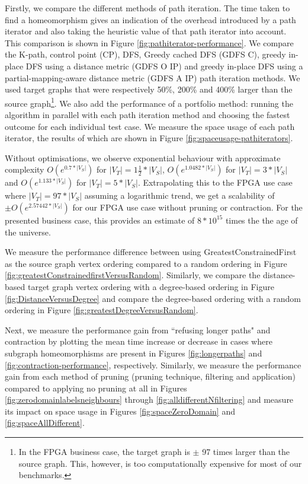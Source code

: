 Firstly, we compare the different methods of path iteration. The time taken to find a homeomorphism gives an indication of the overhead introduced by a path iterator and also taking the heuristic value of that path iterator into account. This comparison is shown in Figure \ref{fig:pathiterator-performance}. We compare the K-path, control point (CP), DFS, Greedy cached DFS (GDFS C), greedy in-place DFS using a distance metric (GDFS O IP) and greedy in-place DFS using a partial-mapping-aware distance metric (GDFS A IP) path iteration methods. We used target graphs that were respectively 50\%, 200\% and 400\% larger than the source graph\footnote{In the FPGA business case, the target graph is $\pm$ 97 times larger than the source graph. This, however, is too computationally expensive for most of our benchmarks.}. We also add the performance of a portfolio method: running the algorithm in parallel with each path iteration method and choosing the fastest outcome for each individual test case. We measure the space usage of each path iterator, the results of which are shown in Figure \ref{fig:spaceusage-pathiterators}.

Without optimisations, we observe exponential behaviour with approximate complexity $O(e^{0.7*|V_S|})$ for $|V_T|=1\frac{1}{2}*|V_S|$, $O(e^{1.0482*|V_S|})$ for $|V_T|=3*|V_S|$ and $O(e^{1.133*|V_S|})$ for $|V_T|=5*|V_S|$. Extrapolating this to the FPGA use case where $|V_T|=97*|V_S|$ assuming a logarithmic trend, we get a scalability of $\pm O(e^{2.57442*|V_S|})$ for our FPGA use case without pruning or contraction. For the presented business case, this provides an estimate of $8 * 10^{15}$ times the the age of the universe.

We measure the performance difference between using GreatestConstrainedFirst as the source graph vertex ordering compared to a random ordering in Figure \ref{fig:greatestConstrainedfirstVersusRandom}. Similarly, we compare the distance-based target graph vertex ordering with a degree-based ordering in Figure \ref{fig:DistanceVersusDegree} and compare the degree-based ordering with a random ordering in Figure \ref{fig:greatestDegreeVersusRandom}.

Next, we measure the performance gain from ``refusing longer paths" and contraction by plotting the mean time increase or decrease in cases where subgraph homeomorphisms are present in Figures \ref{fig:longerpaths} and \ref{fig:contraction-performance}, respectively. Similarly, we measure the performance gain from each method of pruning (pruning technique, filtering and application) compared to applying no pruning at all in Figures \ref{fig:zerodomainlabelsneighbours} through \ref{fig:alldifferentNfiltering} and measure its impact on space usage in Figures \ref{fig:spaceZeroDomain} and \ref{fig:spaceAllDifferent}.

